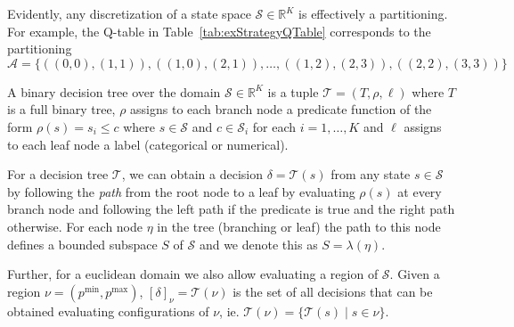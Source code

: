 Evidently, any discretization of a state space $\mathcal{S} \in \mathbb{R}^K$ is
effectively a partitioning. For example, the Q-table in
Table~\ref{tab:exStrategyQTable} corresponds to the partitioning $\mathcal{A} =
\{ ((0,0),(1,1)), ((1,0),(2,1)),\ldots, ((1,2),(2,3)), ((2,2),(3,3)) \} $


\begin{definition}%
\label{def:decisionTree}
    A binary decision tree over the domain $\mathcal{S} \in \mathbb{R}^K$ is a
    tuple $\mathcal{T} = (T, \rho, \ell)$ where $T$ is a full binary tree,
    $\rho$ assigns to each branch node a predicate function of the form $\rho(s)
    = s_i \le c$ where $s \in \mathcal{S}$ and $c \in \mathcal{S}_i$ for each $i
    = 1, \ldots, K$ and $\ell$ assigns to each leaf node a label (categorical or
    numerical).
\end{definition}

For a decision tree $\mathcal{T}$, we can obtain a decision $\delta =
\mathcal{T}(s)$ from any state $s \in \mathcal{S}$ by following the
\textit{path} from the root node to a leaf by evaluating $\rho(s)$ at every
branch node and following the left path if the predicate is true and the right
path otherwise. For each node $\eta$ in the tree (branching or leaf) the path to
this node defines a bounded subspace $S$ of $\mathcal{S}$ and we denote this as
$S = \lambda(\eta)$.

Further, for a euclidean domain we also allow evaluating a region of
$\mathcal{S}$. Given a region $\nu = (p^{\min}, p^{\max})$, $[\delta]_{\nu} =
\mathcal{T}(\nu)$ is the set of all decisions that can be obtained evaluating
configurations of $\nu$, ie. $\mathcal{T}(\nu) = \{ \mathcal{T}(s) \mid s \in \nu
\}$.

